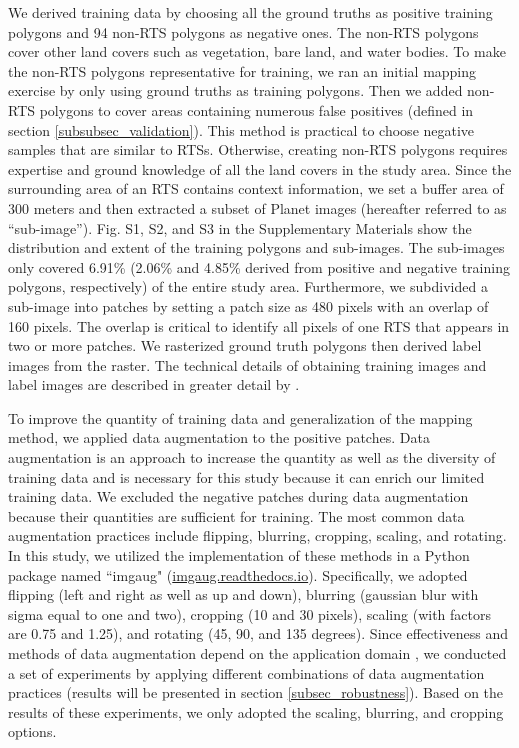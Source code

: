 \documentclass[authoryear,preprint,review,12pt]{elsarticle}
\begin{document}
We derived training data by choosing all the ground truths as positive training polygons and 94 non-RTS polygons as negative ones. The non-RTS polygons cover other land covers such as vegetation, bare land, and water bodies. To make the non-RTS polygons representative for training, we ran an initial mapping exercise by only using ground truths as training polygons. Then we added non-RTS polygons to cover areas containing numerous false positives (defined in section \ref{subsubsec_validation}). This method is practical to choose negative samples that are similar to RTSs. Otherwise, creating non-RTS polygons requires expertise and ground knowledge of all the land covers in the study area. Since the surrounding area of an RTS contains context information, we set a buffer area of 300 meters and then extracted a subset of Planet images (hereafter referred to as “sub-image”). Fig. S1, S2, and S3 in the Supplementary Materials show the distribution and extent of the training polygons and sub-images. The sub-images only covered 6.91\% (2.06\% and 4.85\% derived from positive and negative training polygons, respectively) of the entire study area. Furthermore, we subdivided a sub-image into patches by setting a patch size as 480 pixels with an overlap of 160 pixels. The overlap is critical to identify all pixels of one RTS that appears in two or more patches. We rasterized ground truth polygons then derived label images from the raster. The technical details of obtaining training images and label images are described in greater detail by \cite{huang2018automatic}.  

To improve the quantity of training data and generalization of the mapping method, we applied data augmentation to the positive patches. Data augmentation is an approach to increase the quantity as well as the diversity of training data and is necessary for this study because it can enrich our limited training data. We excluded the negative patches during data augmentation because their quantities are sufficient for training. The most common data augmentation practices include flipping, blurring, cropping, scaling, and rotating. In this study, we utilized the implementation of these methods in a Python package named ``imgaug" (\url{imgaug.readthedocs.io}). Specifically, we adopted flipping (left and right as well as up and down), blurring (gaussian blur with sigma equal to one and two), cropping (10 and 30 pixels), scaling (with factors are 0.75 and 1.25), and rotating (45, 90, and 135 degrees). Since effectiveness and methods of data augmentation depend on the application domain \citep{perez2017effectiveness}, we conducted a set of experiments by applying different combinations of data augmentation practices (results will be presented in section \ref{subsec_robustness}). Based on the results of these experiments, we only adopted the scaling, blurring, and cropping options. 
\end{document}
